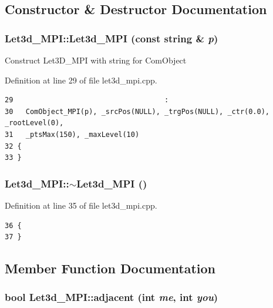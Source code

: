 \subsection{Constructor \& Destructor Documentation}
\subsubsection{\setlength{\rightskip}{0pt plus 5cm}Let3d\_\-MPI::Let3d\_\-MPI (const string \& {\em p})}\label{classLet3d__MPI_0b17f9aae24c3678a5111a92d1b9ffb2_0b17f9aae24c3678a5111a92d1b9ffb2}


Construct Let3D\_\-MPI with string for Com\-Object 

Definition at line 29 of file let3d\_\-mpi.cpp.

\footnotesize\begin{verbatim}29                                    :
30   ComObject_MPI(p), _srcPos(NULL), _trgPos(NULL), _ctr(0.0), _rootLevel(0),
31   _ptsMax(150), _maxLevel(10)
32 {
33 }

\end{verbatim}\normalsize 


\subsubsection{\setlength{\rightskip}{0pt plus 5cm}Let3d\_\-MPI::$\sim$Let3d\_\-MPI ()}\label{classLet3d__MPI_ac2ccc7a2461eab6f090002aec2c87f9_ac2ccc7a2461eab6f090002aec2c87f9}




Definition at line 35 of file let3d\_\-mpi.cpp.

\footnotesize\begin{verbatim}36 {
37 }
\end{verbatim}\normalsize 




\subsection{Member Function Documentation}
\subsubsection{\setlength{\rightskip}{0pt plus 5cm}bool Let3d\_\-MPI::adjacent (int {\em me}, int {\em you})}\label{classLet3d__MPI_bd4b53389da8d68ee7218abbe006c28d_bd4b53389da8d68ee7218abbe006c28d}


